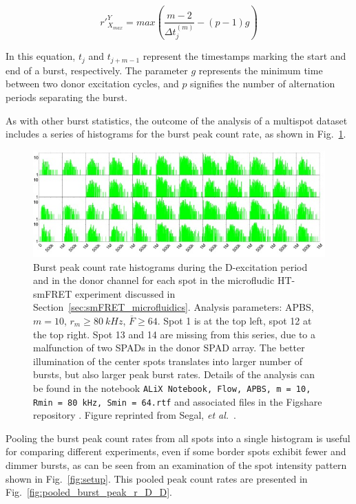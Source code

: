 \begin{equation}
\label{eqn:peak_count_rate'}
r'^{Y}_{X_{max}} = max\left(\frac{m-2}{\Delta t^{(m)}_{j}} - (p -1)g\right)
\end{equation}

In this equation, $t_j$ and $t_{j+m-1}$ represent the timestamps marking the start and end of a burst, respectively. 
The parameter $g$ represents the minimum time between two donor excitation cycles, and $p$ signifies the number of alternation periods separating the burst.

As with other burst statistics, the outcome of the analysis of a multispot dataset includes a series of histograms for the burst peak count rate, as shown in Fig.~\ref{fig:flow_burst_peak_r_D_D_48_spots}.

\begin{figure}
\centering
\includegraphics[width=\textwidth]{chapters/figures/flow_burst_peak_r_D_D_48_spots.jpg}
\caption{\label{fig:flow_burst_peak_r_D_D_48_spots}
Burst peak count rate histograms during the D-excitation period and in the donor channel for each spot in the microfludic \ac{HT-smFRET} experiment discussed in Section~\ref{sec:smFRET_microfluidics}.
Analysis parameters: \ac{APBS}, $m = 10$, $r_m \geq 80~kHz$,
$\overline{F} \geq 64$. 
Spot 1 is at the top left, spot 12 at the top right. Spot 13 and 14 are missing from this series, due to a malfunction of two SPADs in the donor SPAD array. 
The better illumination of the center spots translates into larger number of bursts, but also larger peak burst rates.
Details of the analysis can be found in the notebook \texttt{ALiX Notebook, Flow, \ac{APBS}, m = 10, Rmin = 80 kHz, Smin = 64.rtf} and associated files in the Figshare repository \cite{figshare_repo_2019}.
Figure reprinted from Segal, \textit{et al.}~\cite{segal_methods_2019}.
}
\end{figure}

Pooling the burst peak count rates from all spots into a single histogram is useful for comparing different experiments, even if some border spots exhibit fewer and dimmer bursts, as can be seen from an examination of the spot intensity pattern shown in Fig.~\ref{fig:setup}. 
This pooled peak count rates are presented in Fig.~\ref{fig:pooled_burst_peak_r_D_D}.

